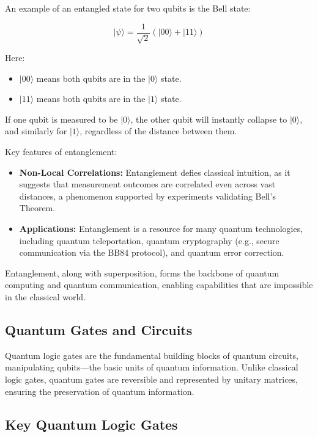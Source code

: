\documentclass[11pt]{article}
\theoremstyle{definition}
\begin{document}
An example of an entangled state for two qubits is the Bell state:

\begin{equation}
|\psi\rangle = \frac{1}{\sqrt{2}} (|00\rangle + |11\rangle)
\end{equation}

Here:
\begin{itemize}
    \item $|00\rangle$ means both qubits are in the $|0\rangle$ state.
    \item $|11\rangle$ means both qubits are in the $|1\rangle$ state.
\end{itemize}

If one qubit is measured to be $|0\rangle$, the other qubit will instantly collapse to $|0\rangle$, and similarly for $|1\rangle$, regardless of the distance between them.

Key features of entanglement:
\begin{itemize}
    \item \textbf{Non-Local Correlations:} Entanglement defies classical intuition, as it suggests that measurement outcomes are correlated even across vast distances, a phenomenon supported by experiments validating Bell's Theorem.
    \item \textbf{Applications:} Entanglement is a resource for many quantum technologies, including quantum teleportation, quantum cryptography (e.g., secure communication via the BB84 protocol), and quantum error correction.
\end{itemize}

Entanglement, along with superposition, forms the backbone of quantum computing and quantum communication, enabling capabilities that are impossible in the classical world.




\subsection*{Quantum Gates and Circuits}


Quantum logic gates are the fundamental building blocks of quantum circuits, manipulating qubits—the basic units of quantum information. Unlike classical logic gates, quantum gates are reversible and represented by unitary matrices, ensuring the preservation of quantum information.

\subsection*{Key Quantum Logic Gates}
\end{document}
